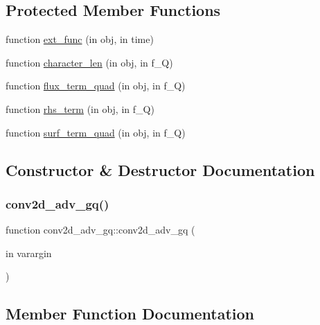 \subsection*{Protected Member Functions}
\begin{DoxyCompactItemize}
\item 
function \hyperlink{classconv2d__adv__gq_a018b65774b743c87bc91b784ff2f97bd}{ext\+\_\+func} (in obj, in time)
\item 
function \hyperlink{classconv2d__adv__gq_ae66fb4e5a223c63241e5b3a94794f318}{character\+\_\+len} (in obj, in f\+\_\+Q)
\item 
function \hyperlink{classconv2d__adv__gq_a43cb678ecc9412a509e4a24d8f68a85a}{flux\+\_\+term\+\_\+quad} (in obj, in f\+\_\+Q)
\item 
function \hyperlink{classconv2d__adv__gq_a7f8bd04f34be49b08e1341701820a097}{rhs\+\_\+term} (in obj, in f\+\_\+Q)
\item 
function \hyperlink{classconv2d__adv__gq_aa0afc30f0d275e7b4ef3db93468ed43d}{surf\+\_\+term\+\_\+quad} (in obj, in f\+\_\+Q)
\end{DoxyCompactItemize}


\subsection{Constructor \& Destructor Documentation}
\mbox{\label{classconv2d__adv__gq_a473c9056ad94e994e82e274fec9316c6}} 
\subsubsection{\texorpdfstring{conv2d\+\_\+adv\+\_\+gq()}{conv2d\_adv\_gq()}}
{\footnotesize\ttfamily function conv2d\+\_\+adv\+\_\+gq\+::conv2d\+\_\+adv\+\_\+gq (\begin{DoxyParamCaption}\item[{in}]{varargin }\end{DoxyParamCaption})}



\subsection{Member Function Documentation}
\mbox{\label{classconv2d__adv__gq_ae66fb4e5a223c63241e5b3a94794f318}} 
